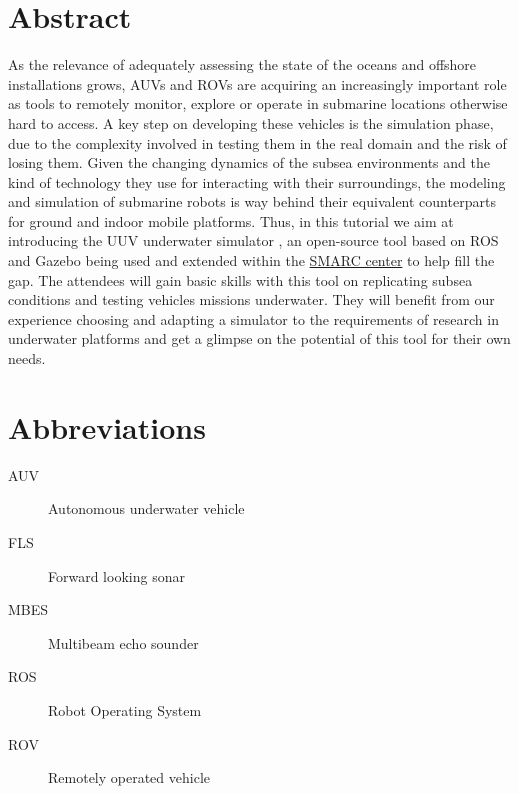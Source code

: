 \documentclass[
10pt, %
a4paper, %
oneside, %
BCOR5mm, %
]{scrartcl}
\begin{document}
\section*{Abstract} 
As the relevance of adequately assessing the state of the oceans and offshore installations grows, AUVs and ROVs are acquiring an increasingly important role as tools to remotely monitor, explore or operate in submarine locations otherwise hard to access.
A key step on developing these vehicles is the simulation phase, due to the complexity involved in testing them in the real domain and the risk of losing them.
Given the changing dynamics of the subsea environments and the kind of technology they use for interacting with their surroundings, the modeling and simulation of submarine robots is way behind their equivalent counterparts for ground and indoor mobile platforms.
Thus, in this tutorial we aim at introducing the UUV underwater simulator \cite{Manhaes_2016}, an open-source tool based on ROS \cite{Quigley09} and Gazebo \cite{koenig2004design} being used and extended within the \href{https://smarc.se/}{SMARC center} to help fill the gap. 
The attendees will gain basic skills with this tool on replicating subsea conditions and testing vehicles missions underwater.
They will benefit from our experience choosing and adapting a simulator to the requirements of research in underwater platforms and get a glimpse on the potential of this tool for their own needs.


\section{Abbreviations}
\label{sec:abbreviations}
\begin{description}
\item [AUV] Autonomous underwater vehicle
\item [FLS] Forward looking sonar
\item [MBES] Multibeam echo sounder
\item [ROS] Robot Operating System
\item [ROV] Remotely operated vehicle
\end{description}
\end{document}
